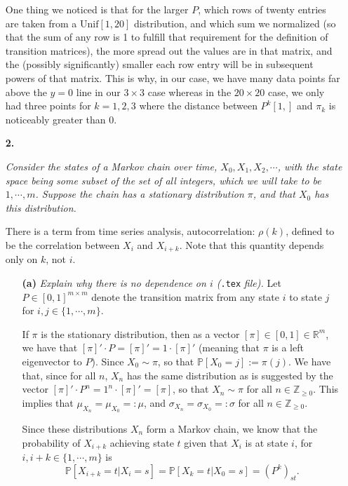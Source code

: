 \documentclass [10pt] {article}
\newcommand{\R}{\mathbb{R}}
\newcommand{\Z}{\mathbb{Z}}
\newcommand{\ds}{\displaystyle}
\renewcommand{\P}{\mathbb{P}}
\begin{document}
\begin{enumerate}
One thing we noticed is that for the larger $P$, which rows of twenty entries are taken from a $\mathrm{Unif}[1,20]$ distribution, and which sum we normalized (so that the sum of any row is 1 to fulfill that requirement for the definition of transition matrices), the more spread out the values are in that matrix, and the (possibly significantly) smaller each row entry will be in subsequent powers of that matrix. This is why, in our case, we have many data points far above the $y=0$ line in our $3\times3$ case whereas in the $20\times20$ case, we only had three points for $k=1,2,3$ where the distance between $P^k[1,]$ and $\pi_k$ is noticeably greater than 0.
\item[{\bf2.}] {\it Consider the states of a Markov chain over time, $X_0, X_1, X_2, \cdots$, with the state space being some subset of the set of all integers, which we will take to be $1,\cdots,m$. Suppose the chain has a stationary distribution $\pi$, and that $X_0$ has this distribution.

There is a term from time series analysis, autocorrelation: $\rho(k)$, defined to be the correlation between $X_i$ and $X_{i+k}$. Note that this quantity depends only on $k$, not $i$.}
\begin{enumerate}
\item[{\bf(a)}] {\it Explain why there is no dependence on $i$ (}\texttt{.tex} {\it file).}
Let $P\in[0,1]^{m\times m}$ denote the transition matrix from any state $i$ to state $j$ for $i,j\in\{1,\cdots,m\}$.

If $\pi$ is the stationary distribution, then as a vector $[\pi]\in[0,1]\in\R^m$, we have that $[\pi]'\cdot P = [\pi]' = 1\cdot[\pi]'$ (meaning that $\pi$ is a left eigenvector to $P$). Since $X_0\sim\pi$, so that $\P[X_0=j]:=\pi(j)$. We have that, since for all $n$, $X_n$ has the same distribution as is suggested by the vector $[\pi]'\cdot P^{n}=1^n\cdot[\pi]'=[\pi]$, so that $X_n\sim\pi$ for all $n\in\Z_{\ge0}$. This implies that $\ds\mu_{X_n}=\mu_{X_0}=:\mu$, and $\ds\sigma_{X_n}=\sigma_{X_0}=:\sigma$ for all $n\in\Z_{\ge0}$.

Since these distributions $X_n$ form a Markov chain, we know that the probability of $X_{i+k}$ achieving state $t$ given that $X_i$ is at state $i$, for $i,i+k\in\{1,\cdots,m\}$ is
\begin{equation}\P[X_{i+k}=t|X_i=s]=\P[X_k=t|X_0=s]=(P^k)_{st}.\end{equation}


\end{enumerate}
\end{enumerate}
\end{document}
